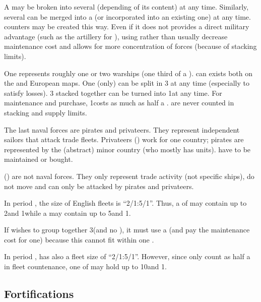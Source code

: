 
 A \FLEET may be broken into several \ND
(depending of its content) at any time.
\bparag Similarly, several \ND can be merged into a \FLEET (or incorporated
into an existing one) at any time. \FLEET counters may be created this way.
\bparag Even if it does not provides a direct military advantage (such as the
artillery for \ARMY), using \FLEET rather than \ND usually decrease
maintenance cost and allows for more concentration of forces (because of
stacking limits).

 One \NDE represents roughly one or two
warships (one third of a \NWD).
\bparag \NDE can exists both on the \ROTW and European maps.
\bparag One \NWD (only) can be split in 3 \NDE at any time (especially to
satisfy losses). 3 \NDE stacked together can be turned into 1\NWD at any time.
\bparag For maintenance and purchase, 1\NDE costs as much as half a \NWD.
\bparag \NDE are never counted in stacking and supply limits.

\aparag[Pirates.] The last naval forces are pirates and privateers. They
represent independent sailors that attack trade fleets. Privateers (\corsaire)
work for one country; pirates are represented by the (abstract) minor country
 (who mostly has \corsaire units). \corsaire have to be
maintained or bought.

 (\TradeFLEET) are not naval forces. They only represent
trade activity (not specific ships), do not move and can only be attacked by
pirates and privateers.

\begin{exemple}
  In period , the size of English fleets is ``2/1:5/1''. Thus, a
  \FLEET\Facemoins of \ANG may contain up to 2\NWD and 1\NTD while a
  \FLEET\Faceplus may contain up to 5\NWD and 1\NTD.

  If \ANG wishes to group together 3\NWD (and no \NTD), it must use a
  \FLEET\Faceplus (and pay the maintenance cost for one) because this cannot
  fit within one \FLEET\Facemoins.

  In period , \TUR has also a fleet size of ``2/1:5/1''. However,
  since \NGD only count as half a \ND in fleet countenance, one
  \FLEET\Faceplus of \TUR may hold up to 10\NGD and 1\NTD.
\end{exemple}



\subsection{Fortifications}

